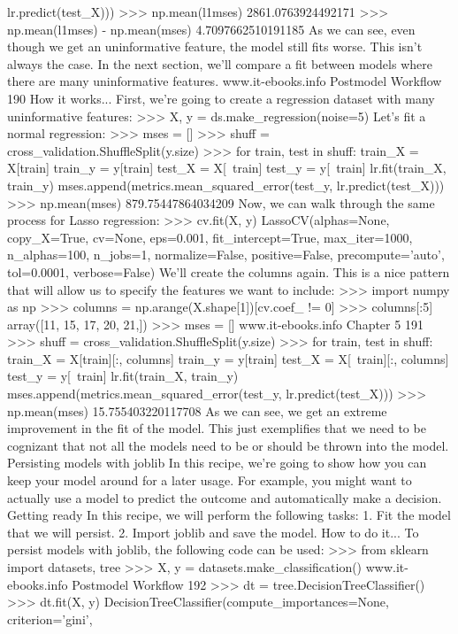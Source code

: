 lr.predict(test_X)))
>>> np.mean(l1mses)
2861.0763924492171
>>> np.mean(l1mses) - np.mean(mses)
4.7097662510191185
As we can see, even though we get an uninformative feature, the model still fits worse. This
isn't always the case. In the next section, we'll compare a fit between models where there are
many uninformative features.
www.it-ebooks.info
Postmodel Workflow
190
How it works...
First, we're going to create a regression dataset with many uninformative features:
>>> X, y = ds.make_regression(noise=5)
Let's fit a normal regression:
>>> mses = []
>>> shuff = cross_validation.ShuffleSplit(y.size)
>>> for train, test in shuff:
train_X = X[train]
train_y = y[train]
test_X = X[~train]
test_y = y[~train]
lr.fit(train_X, train_y)
mses.append(metrics.mean_squared_error(test_y,
lr.predict(test_X)))
>>> np.mean(mses)
879.75447864034209
Now, we can walk through the same process for Lasso regression:
>>> cv.fit(X, y)
LassoCV(alphas=None, copy_X=True, cv=None, eps=0.001,
fit_intercept=True, max_iter=1000, n_alphas=100,
n_jobs=1, normalize=False, positive=False, precompute='auto',
tol=0.0001, verbose=False)
We'll create the columns again. This is a nice pattern that will allow us to specify the features
we want to include:
>>> import numpy as np
>>> columns = np.arange(X.shape[1])[cv.coef_ != 0]
>>> columns[:5]
array([11, 15, 17, 20, 21,])
>>> mses = []
www.it-ebooks.info
Chapter 5
191
>>> shuff = cross_validation.ShuffleSplit(y.size)
>>> for train, test in shuff:
train_X = X[train][:, columns]
train_y = y[train]
test_X = X[~train][:, columns]
test_y = y[~train]
lr.fit(train_X, train_y)
mses.append(metrics.mean_squared_error(test_y,
lr.predict(test_X)))
>>> np.mean(mses)
15.755403220117708
As we can see, we get an extreme improvement in the fit of the model. This just exemplifies
that we need to be cognizant that not all the models need to be or should be thrown into
the model.
Persisting models with joblib
In this recipe, we're going to show how you can keep your model around for a later usage.
For example, you might want to actually use a model to predict the outcome and automatically
make a decision.
Getting ready
In this recipe, we will perform the following tasks:
1. Fit the model that we will persist.
2. Import joblib and save the model.
How to do it...
To persist models with joblib, the following code can be used:
>>> from sklearn import datasets, tree
>>> X, y = datasets.make_classification()
www.it-ebooks.info
Postmodel Workflow
192
>>> dt = tree.DecisionTreeClassifier()
>>> dt.fit(X, y)
DecisionTreeClassifier(compute_importances=None, criterion='gini',
